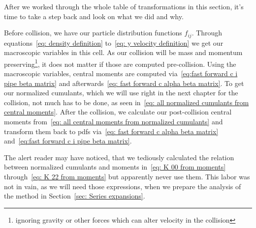 
After we worked through the whole table of transformations in this section, it's time to take a step back and look on what we did and why.

Before collision, we have our particle distribution functions $f_{ij}$.
Through equations~\eqref{eq: density definition} to~\eqref{eq: y velocity definition} we get our macroscopic variables in this cell.
As our collision will be mass and momentum preserving\footnote{ignoring gravity or other forces which can alter velocity in the collision}, it does not matter if those are computed pre-collision.
Using the macroscopic variables, central moments are computed via~\eqref{eq:fast forward c i pipe beta matrix} and afterwards~\eqref{eq: fast forward c alpha beta matrix}.
To get our normalized cumulants, which we will use right in the next chapter for the collision, not much has to be done, as seen in~\eqref{eq: all normalized cumulants from central moments}.
After the collision, we calculate our post-collision central moments from~\eqref{eq: all central moments from normalized cumulants}
and transform them back to \glspl{pdf} via~\eqref{eq: fast forward c alpha beta matrix} and~\eqref{eq:fast forward c i pipe beta matrix}.

The alert reader may have noticed, that we tediously calculated the relation between normalized cumulants and moments in~\eqref{eq: K 00 from moments} through~\eqref{eq: K 22 from moments} but apparently never use them.
This labor was not in vain, as we will need those expressions, when we prepare the analysis of the method in Section~\ref{sec: Series expansions}.
